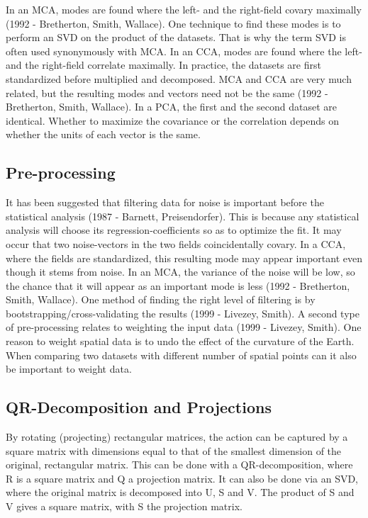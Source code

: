 \documentclass{acm_proc_article-sp}
\begin{document}
In an MCA, modes are found where the left- and the right-field covary maximally (1992 - Bretherton, Smith, Wallace). One technique to find these modes is to perform an SVD on the product of the datasets. That is why the term SVD is often used synonymously with MCA.
In an CCA, modes are found where the left- and the right-field correlate maximally. In practice, the datasets are first standardized before multiplied and decomposed. MCA and CCA are very much related, but the resulting modes and vectors need not be the same (1992 - Bretherton, Smith, Wallace).
In a PCA, the first and the second dataset are identical. Whether to maximize the covariance or the correlation depends on whether the units of each vector is the same.

\subsection{Pre-processing}
\label{sec:Introductio Pre-processingn}

It has been suggested that filtering data for noise is important before the statistical analysis (1987 - Barnett, Preisendorfer). This is because any statistical analysis will choose its regression-coefficients so as to optimize the fit. It may occur that two noise-vectors in the two fields coincidentally covary. In a CCA, where the fields are standardized, this resulting mode may appear important even though it stems from noise. In an MCA, the variance of the noise will be low, so the chance that it will appear as an important mode is less (1992 - Bretherton, Smith, Wallace). One method of finding the right level of filtering is by bootstrapping/cross-validating the results (1999 - Livezey, Smith).
A second type of pre-processing relates to weighting the input data (1999 - Livezey, Smith). One reason to weight spatial data is to undo the effect of the curvature of the Earth. When comparing two datasets with different number of spatial points can it also be important to weight data.

\subsection{QR-Decomposition and Projections}
\label{sec:Introduction QR-Decomposition and Projections}

By rotating (projecting) rectangular matrices, the action can be captured by a square matrix with dimensions equal to that of the smallest dimension of the original, rectangular matrix. This can be done with a QR-decomposition, where R is a square matrix and Q a projection matrix. It can also be done via an SVD, where the original matrix is decomposed into U, S and V. The product of S and V gives a square matrix, with S the projection matrix.
\end{document}
